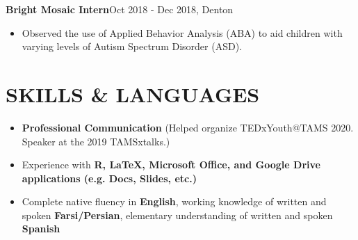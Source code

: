 \documentclass[margin]{res}
\begin{document}
\begin{resume}
\textbf{Bright Mosaic Intern}\hfill Oct 2018 - Dec 2018, Denton
\begin{itemize}
\item Observed the use of Applied Behavior Analysis (ABA) to aid children with varying levels of Autism Spectrum Disorder (ASD).
\end{itemize}




\section{SKILLS \& LANGUAGES}
\begin{itemize}
\item \textbf{Professional Communication} (Helped organize TEDxYouth@TAMS 2020. Speaker at the 2019 TAMSxtalks.)
\item Experience with \textbf{R, LaTeX, Microsoft Office, and Google Drive applications (e.g. Docs, Slides, etc.)}
\item Complete native fluency in \textbf{English}, working knowledge of written and spoken \textbf{Farsi/Persian}, elementary understanding of written and spoken \textbf{Spanish}
\end{itemize}


\end{resume}
\end{document}
